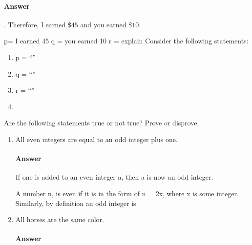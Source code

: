 \documentclass{article}
\begin{document}
\paragraph{Answer}


.
Therefore, I earned $\$45$ and you earned $\$10$.

p= I earned 45
q = you earned 10
r = explain
Consider the following statements:
\begin{enumerate}
    \item p = ``''
    \item q = ``''
    \item r = ``''
    \item {}
\end{enumerate}


\collab{\todo{}}

Are the following statements true or not true?    Prove or disprove.

\begin{enumerate}

    \item All even integers are equal to an odd integer plus one.

        \paragraph{Answer}
        If one is added to an even integer a, then a is now an odd integer.

        A number n, is even if it is in the form of n = 2x, where x is some integer.
        Similarly, by definition an odd integer is

    \item All horses are the same color.

        \paragraph{Answer}

\end{enumerate}
\end{document}
